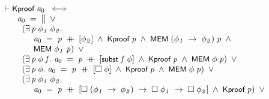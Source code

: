 \documentclass[letterpaper]{article}
\renewcommand{\HOLConst}[1]{{\textsf{\upshape\small #1}}}
\newenvironment{holmath}{\begin{displaymath}\begin{array}{l}}{\end{array}\end{displaymath}\ignorespacesafterend}
\begin{document}
\begin{holmath}
  \ensuremath{\HOLTokenTurnstile}\HOLConst{Kproof}\;\HOLFreeVar{a\sb{\mathrm{0}}}\;\HOLSymConst{\HOLTokenEquiv{}}\\
\;\;\;\;\;\;\;\HOLFreeVar{a\sb{\mathrm{0}}}\;\HOLSymConst{=}\;[]\;\HOLSymConst{\HOLTokenDisj{}}\\
\;\;\;\;\;\;\;\;\;(\HOLSymConst{\HOLTokenExists{}}\HOLBoundVar{p}\;\HOLBoundVar{\ensuremath{\phi\sb{1}}}\;\HOLBoundVar{\ensuremath{\phi\sb{2}}}.\\
\;\;\;\;\;\;\;\;\;\;\;\;\;\;\HOLFreeVar{a\sb{\mathrm{0}}}\;\HOLSymConst{=}\;\HOLBoundVar{p}\;\HOLSymConst{\HOLTokenDoublePlus}\;[\HOLBoundVar{\ensuremath{\phi\sb{2}}}]\;\HOLSymConst{\HOLTokenConj{}}\;\HOLConst{Kproof}\;\HOLBoundVar{p}\;\HOLSymConst{\HOLTokenConj{}}\;\HOLConst{MEM}\;(\HOLBoundVar{\ensuremath{\phi\sb{1}}}\;\HOLSymConst{\ensuremath{\rightarrow}}\;\HOLBoundVar{\ensuremath{\phi\sb{2}}})\;\HOLBoundVar{p}\;\HOLSymConst{\HOLTokenConj{}}\\
\;\;\;\;\;\;\;\;\;\;\;\;\;\;\HOLConst{MEM}\;\HOLBoundVar{\ensuremath{\phi\sb{1}}}\;\HOLBoundVar{p})\;\HOLSymConst{\HOLTokenDisj{}}\\
\;\;\;\;\;\;\;\;\;(\HOLSymConst{\HOLTokenExists{}}\HOLBoundVar{p}\;\HOLBoundVar{\ensuremath{\phi}}\;\HOLBoundVar{f}.\;\HOLFreeVar{a\sb{\mathrm{0}}}\;\HOLSymConst{=}\;\HOLBoundVar{p}\;\HOLSymConst{\HOLTokenDoublePlus}\;[\HOLConst{subst}\;\HOLBoundVar{f}\;\HOLBoundVar{\ensuremath{\phi}}]\;\HOLSymConst{\HOLTokenConj{}}\;\HOLConst{Kproof}\;\HOLBoundVar{p}\;\HOLSymConst{\HOLTokenConj{}}\;\HOLConst{MEM}\;\HOLBoundVar{\ensuremath{\phi}}\;\HOLBoundVar{p})\;\HOLSymConst{\HOLTokenDisj{}}\\
\;\;\;\;\;\;\;\;\;(\HOLSymConst{\HOLTokenExists{}}\HOLBoundVar{p}\;\HOLBoundVar{\ensuremath{\phi}}.\;\HOLFreeVar{a\sb{\mathrm{0}}}\;\HOLSymConst{=}\;\HOLBoundVar{p}\;\HOLSymConst{\HOLTokenDoublePlus}\;[\HOLSymConst{\ensuremath{\Box}}\;\HOLBoundVar{\ensuremath{\phi}}]\;\HOLSymConst{\HOLTokenConj{}}\;\HOLConst{Kproof}\;\HOLBoundVar{p}\;\HOLSymConst{\HOLTokenConj{}}\;\HOLConst{MEM}\;\HOLBoundVar{\ensuremath{\phi}}\;\HOLBoundVar{p})\;\HOLSymConst{\HOLTokenDisj{}}\\
\;\;\;\;\;\;\;\;\;(\HOLSymConst{\HOLTokenExists{}}\HOLBoundVar{p}\;\HOLBoundVar{\ensuremath{\phi\sb{1}}}\;\HOLBoundVar{\ensuremath{\phi\sb{2}}}.\\
\;\;\;\;\;\;\;\;\;\;\;\;\;\;\HOLFreeVar{a\sb{\mathrm{0}}}\;\HOLSymConst{=}\;\HOLBoundVar{p}\;\HOLSymConst{\HOLTokenDoublePlus}\;[\HOLSymConst{\ensuremath{\Box}}\;(\HOLBoundVar{\ensuremath{\phi\sb{1}}}\;\HOLSymConst{\ensuremath{\rightarrow}}\;\HOLBoundVar{\ensuremath{\phi\sb{2}}})\;\HOLSymConst{\ensuremath{\rightarrow}}\;\HOLSymConst{\ensuremath{\Box}}\;\HOLBoundVar{\ensuremath{\phi\sb{1}}}\;\HOLSymConst{\ensuremath{\rightarrow}}\;\HOLSymConst{\ensuremath{\Box}}\;\HOLBoundVar{\ensuremath{\phi\sb{2}}}]\;\HOLSymConst{\HOLTokenConj{}}\;\HOLConst{Kproof}\;\HOLBoundVar{p})\;\HOLSymConst{\HOLTokenDisj{}}\\

\end{holmath}
\end{document}
